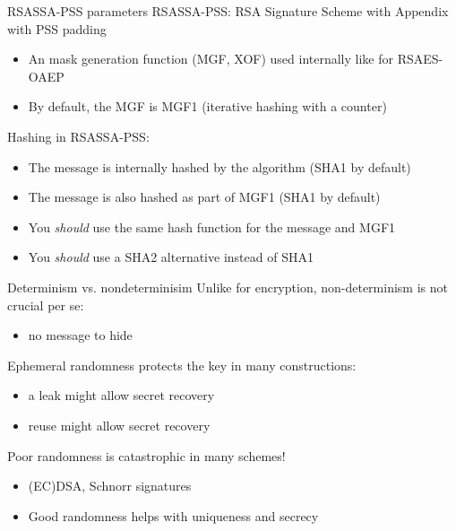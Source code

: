 \begin{frame}{RSASSA-PSS parameters}
  RSASSA-PSS: RSA Signature Scheme with Appendix with PSS padding
  \begin{itemize}[<+(1)->]
    \item An mask generation function (MGF, XOF) used internally like for RSAES-OAEP
    \item By default, the MGF is MGF1 (iterative hashing with a counter)
  \end{itemize}

  \vfill

  \pause
  Hashing in RSASSA-PSS:
  \begin{itemize}[<+(1)->]
    \item The message is internally hashed by the algorithm (SHA1 by default)
    \item The message is also hashed as part of MGF1 (SHA1 by default)
    \item You \emph{should} use the same hash function for the message and MGF1
    \item You \emph{should} use a SHA2 alternative instead of SHA1
  \end{itemize}
\end{frame}

\begin{frame}{Determinism vs. nondeterminisim}
  \pause
  Unlike for encryption, non-determinism is not crucial per se:
  \begin{itemize}[<+(1)->]
    \item no message to hide
  \end{itemize}

  \vspace*{0.5em}

  \pause
  Ephemeral randomness protects the key in many constructions:
  \begin{itemize}[<+(1)->]
    \item a leak might allow secret recovery
    \item reuse might allow secret recovery
  \end{itemize}

  \vspace*{0.5em}

  \pause
  Poor randomness is catastrophic in many schemes!
  \begin{itemize}[<+(1)->]
    \item (EC)DSA, Schnorr signatures
    \item Good randomness helps with uniqueness and secrecy
  \end{itemize}
\end{frame}

